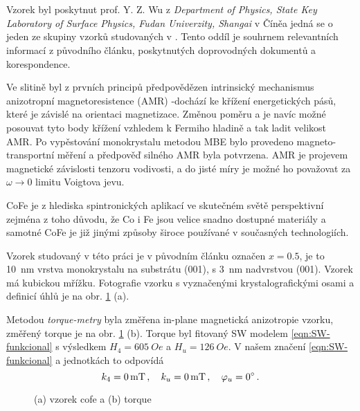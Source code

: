 \section{}
\label{chap:vzorek-cofe}

Vzorek byl poskytnut prof. Y. Z. Wu z \emph{Department of Physics, State Key Laboratory of Surface Physics, Fudan Univerzity, Shangai} v Číněa jedná se o jeden ze skupiny vzorků studovaných v .
Tento oddíl je souhrnem relevantních informací z původního článku, poskytnutých doprovodných dokumentů a korespondence.

Ve slitině  byl z prvních principů předpovědězen intrinsický mechanismus anizotropní magnetoresistence (AMR) -\tododash dochází ke křížení energetických pásů, které je závislé na orientaci magnetizace.
Změnou poměru  a  je navíc možné posouvat tyto body křížení vzhledem k Fermiho hladině a tak ladit velikost AMR.
Po vypěstování monokrystalu metodou MBE bylo provedeno magneto-transportní měření a předpověď silného AMR byla potvrzena.
AMR je projevem magnetické závislosti tenzoru vodivosti, a do jisté míry je možné ho považovat za $\omega\to 0$ limitu Voigtova jevu.

CoFe je z hlediska spintronických aplikací ve skutečném světě perspektivní zejména z toho důvodu, že Co i Fe jsou velice snadno dostupné materiály a samotné CoFe je již jinými způsoby široce používané v současných technologiích.

Vzorek studovaný v této práci je v původním článku označen $x=0.5$, je to \SI{10}{\nano\meter} vrstva monokrystalu  na substrátu (001), s \SI{3}{\nano\meter} nadvrstvou (001).
Vzorek má kubickou mřížku.
Fotografie vzorku s vyznačenými krystalografickými osami a definicí úhlů je na obr. \ref{fig:vzorek-cofe} (a).

Metodou \emph{torque-metry} byla změřena in-plane magnetická anizotropie vzorku, změřený torque je na obr. \ref{fig:vzorek-cofe} (b).
Torque byl fitovaný SW modelem \eqref{eqn:SW-funkcional} s výsledkem $H_4=\SI{605}{Oe}$ a $H_u=\SI{126}{Oe}$.
V našem značení \eqref{eqn:SW-funkcional} a jednotkách to odpovídá
\begin{equation}
    k_4 = \SI{0}{\milli\tesla} \,,\quad k_u = \SI{0}{mT} \,,\quad \varphi_u = \SI{0}{\degree} \,.
\end{equation}

\begin{figure}[htbp]
    \centering
    \caption{(a) vzorek cofe a (b) torque}
    \label{fig:vzorek-cofe}
\end{figure}

